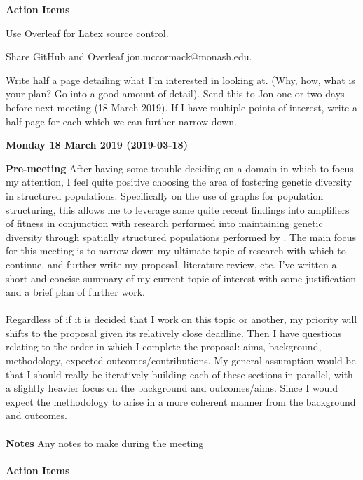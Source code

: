 \documentclass[10pt,a4paper]{article}
\newcommand{\cmark}{\ding{51}}%
\newcommand{\done}{\rlap{$\square$}{\raisebox{2pt}{\large\hspace{1pt}\cmark}}%
	\hspace{-2.5pt}}
\begin{document}
	\textbf{Action Items}
	\\
	\begin{todolist}
		\item[\done] Use Overleaf for Latex source control.
		\item[\done] Share GitHub and Overleaf jon.mccormack@monash.edu. 
		\item[\done] Write half a page detailing what I'm interested in looking at. (Why, how, what is your plan? Go into a good amount of detail). 
		Send this to Jon one or two days before next meeting (18 March 2019).
		If I have multiple points of interest, write a half page for each which we can further narrow down.
	\end{todolist}
	
	\begin{center} \textbf{Monday 18 March 2019 (2019-03-18)} \end{center} 
	\textbf{Pre-meeting}
	After having some trouble deciding on a domain in which to focus my attention, I feel quite positive choosing the area of fostering genetic diversity in structured populations.
	Specifically on the use of graphs for population structuring, this allows me to leverage some quite recent findings into amplifiers of fitness \citep{graph-amplifiers} in conjunction with research performed into maintaining genetic diversity through spatially structured populations performed by \citep{distributed-evolutionary-art}.
	The main focus for this meeting is to narrow down my ultimate topic of research with which to continue, and further write my proposal, literature review, etc.
	I've written a short and concise summary of my current topic of interest with some justification and a brief plan of further work.
	\\\\
	Regardless of if it is decided that I work on this topic or another, my priority will shifts to the proposal given its relatively close deadline.
	Then I have questions relating to the order in which I complete the proposal: aims, background, methodology, expected outcomes/contributions.
	My general assumption would be that I should really be iteratively building each of these sections in parallel, with a slightly heavier focus on the background and outcomes/aims.
	Since I would expect the methodology to arise in a more coherent manner from the background and outcomes.
	\\\\
	\textbf{Notes}
	Any notes to make during the meeting
	\\\\
	\textbf{Action Items}
	\begin{todolist}
		\item 
	\end{todolist}
	\pagebreak
	
	
	
	
\end{document}
